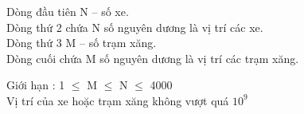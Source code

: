 Dòng đầu tiên N – số xe.   
\\   Dòng thứ 2 chứa N số nguyên dương là vị trí các xe.   
\\   Dòng thứ 3 M – số trạm xăng.   
\\   Dòng cuối chứa M số nguyên dương là vị trí các trạm xăng.  

    Giới hạn :      1 $\le$  M  $\le$  N  $\le$  4000   
\\   Vị trí của xe hoặc trạm xăng không vượt quá $10^{9}$